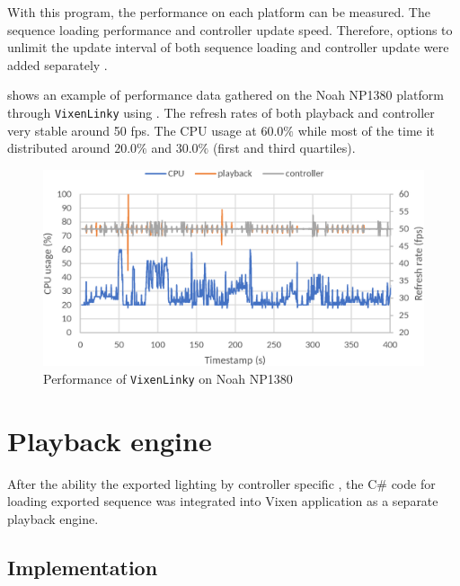 
With this program, the  performance  on each platform can be measured. The  sequence loading performance and controller update speed. Therefore, options to unlimit the update interval of both sequence loading and controller update were added separately .

 shows an example of performance data gathered on the Noah NP1380 platform through \texttt{VixenLinky} using . The refresh rates of both playback and controller  very stable around  50 fps. The CPU usage  at $60.0 \%$\ca{,} while most of the time it  distributed around $20.0 \%$ and $30.0 \%$ (first and third quartiles).

\begin{figure}[!t]
  \centering
  \includegraphics[width=0.8\columnwidth]{Figs/vixenlinky_noah.eps}
  \caption{\footnotesize Performance of \texttt{VixenLinky} on Noah NP1380}
  \label{fig:vixenlinky_noah}
\end{figure}

\section{Playback engine}

After  the ability  the exported lighting  by controller specific , the C\# code for loading exported sequence  was integrated into Vixen application as a separate playback engine.

\subsection{Implementation}

